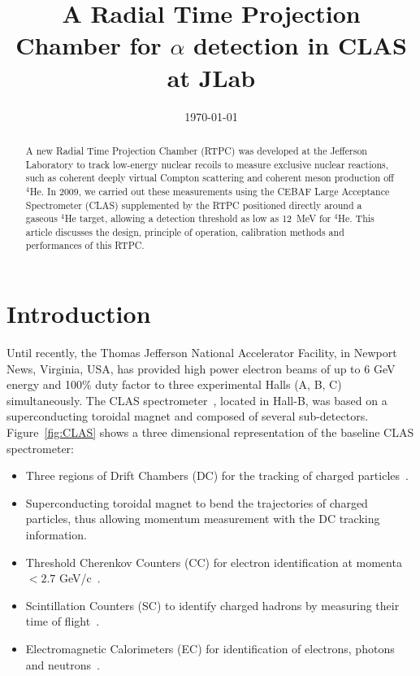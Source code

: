 \documentclass[preprint,5p]{elsarticle}
\begin{document}
\title{\vspace{-15mm}\fontsize{24pt}{10pt}\selectfont\textbf{A Radial Time 
Projection Chamber for $\alpha$ detection in CLAS at JLab}}
  

\date{\today}

\begin{abstract}
A new Radial Time Projection Chamber (RTPC) was developed at the Jefferson 
Laboratory to track low-energy nuclear recoils to measure
exclusive nuclear reactions, such as coherent deeply virtual Compton scattering
and coherent meson production off $^4$He. In
2009, we carried out these measurements using the CEBAF Large
Acceptance Spectrometer (CLAS) supplemented by
the RTPC positioned directly around a gaseous $^4$He target, allowing a detection
threshold as low as 12~MeV for $^4$He. This article discusses the design,
principle of operation, calibration methods and performances of this RTPC.
\end{abstract}

\maketitle


\section{Introduction} \label{sec:level1}

Until recently, the Thomas Jefferson National Accelerator Facility, in 
Newport News, Virginia, USA, has provided high power electron beams of 
up to 6 GeV energy and 100$\%$ duty factor to three experimental Halls (A, B, C) 
simultaneously. The CLAS spectrometer~\cite{Mecking:2003zu}, located
in Hall-B, was based on a superconducting toroidal magnet and composed of 
several sub-detectors. Figure~\ref{fig:CLAS} shows a three dimensional 
representation of the baseline CLAS spectrometer:
\begin{itemize}
 \item Three regions of Drift Chambers (DC) for the tracking of charged 
       particles~\cite{Mestayer:2000we}.
 \item Superconducting toroidal magnet to bend the trajectories 
       of charged particles, thus allowing momentum measurement with the DC tracking information.
 \item Threshold Cherenkov Counters (CC) for electron identification at momenta 
    $<2.7$ GeV/c~\cite{Adams:2001kk}.
 \item Scintillation Counters (SC) to identify charged hadrons by measuring their 
       time of flight~\cite{Smith:1999ii}.
 \item Electromagnetic Calorimeters (EC) for identification of electrons, 
       photons and neutrons~\cite{Amarian:2001zs}.
\end{itemize}
\end{document}
